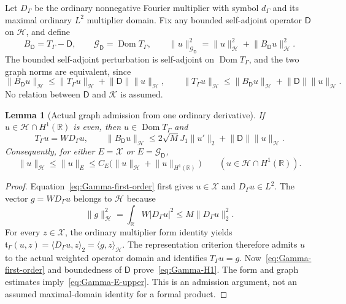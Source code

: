 \documentclass[11pt,a4paper]{article}
\numberwithin{equation}{section}
\newtheorem{lemma}[theorem]{Lemma}
\theoremstyle{definition}
\theoremstyle{remark}
\newcommand{\R}{\mathbb R}
\newcommand{\Hh}{\mathcal H}
\newcommand{\Kk}{\mathcal K}
\newcommand{\ip}[2]{\langle #1,#2\rangle}
\newcommand{\norm}[1]{\lVert #1\rVert}
\begin{document}
Let $D_\Gamma$ be the ordinary nonnegative Fourier multiplier with symbol $d_\Gamma$ and its maximal ordinary $L^2$ multiplier domain. Fix any bounded self-adjoint operator $\mathsf D$ on $\Hh$, and define
\begin{equation}\label{eq:Gamma-graph}
 B_{\mathsf D}=T_\Gamma-\mathsf D,\qquad
 \mathcal G_{\mathsf D}=\operatorname{Dom}T_\Gamma,
 \qquad
 \norm{u}_{\mathcal G_{\mathsf D}}^2
 =\norm{u}_{\Hh}^2+\norm{B_{\mathsf D}u}_{\Hh}^2.
\end{equation}
The bounded self-adjoint perturbation is self-adjoint on $\operatorname{Dom}T_\Gamma$, and the two graph norms are equivalent, since
\[
 \norm{B_{\mathsf D}u}_{\Hh}\le\norm{T_\Gamma u}_{\Hh}
       +\norm{\mathsf D}\norm{u}_{\Hh},\qquad
 \norm{T_\Gamma u}_{\Hh}\le\norm{B_{\mathsf D}u}_{\Hh}
       +\norm{\mathsf D}\norm{u}_{\Hh}.
\]
No relation between $\mathsf D$ and $\Kk$ is assumed.

\begin{lemma}[Actual graph admission from one ordinary derivative]\label{lem:Gamma-H1}
If $u\in\Hh\cap H^1(\R)$ is even, then $u\in\operatorname{Dom}T_\Gamma$ and
\begin{equation}\label{eq:Gamma-H1}
 T_\Gamma u=W D_\Gamma u,\qquad
 \norm{B_{\mathsf D}u}_{\Hh}
 \le2\sqrt M J_1\norm{u'}_2+\norm{\mathsf D}\norm{u}_{\Hh}.
\end{equation}
Consequently, for either $E=\mathcal X$ or $E=\mathcal G_{\mathsf D}$,
\begin{equation}\label{eq:Gamma-E-upper}
 \norm{u}_{\Hh}\le\norm{u}_E
 \le C_E\bigl(\norm{u}_{\Hh}+\norm{u}_{H^1(\R)}\bigr)
 \qquad(u\in\Hh\cap H^1(\R)).
\end{equation}
\end{lemma}
\begin{proof}
Equation~\eqref{eq:Gamma-first-order} first gives $u\in\mathcal X$ and $D_\Gamma u\in L^2$. The vector $g=WD_\Gamma u$ belongs to $\Hh$ because
\[
 \norm{g}_{\Hh}^2=\int_\R W|D_\Gamma u|^2
 \le M\norm{D_\Gamma u}_2^2.
\]
For every $z\in\mathcal X$, the ordinary multiplier form identity yields
$\mathfrak t_\Gamma(u,z)=\ip{D_\Gamma u}{z}_2=\ip{g}{z}_{\Hh}$.
The representation criterion therefore admits $u$ to the actual weighted operator domain and identifies $T_\Gamma u=g$. Now~\eqref{eq:Gamma-first-order} and boundedness of $\mathsf D$ prove~\eqref{eq:Gamma-H1}. The form and graph estimates imply~\eqref{eq:Gamma-E-upper}. This is an admission argument, not an assumed maximal-domain identity for a formal product.
\end{proof}
\end{document}
